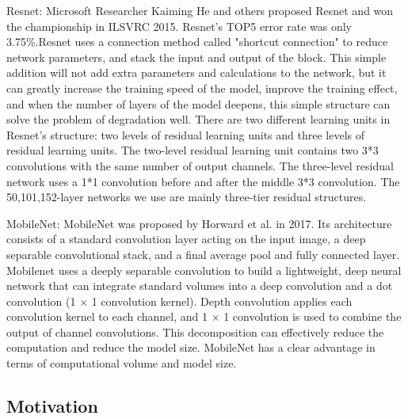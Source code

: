 Resnet: Microsoft Researcher Kaiming He and others proposed Resnet and won the championship in ILSVRC 2015. Resnet's TOP5 error rate was only 3.75\%.Resnet uses a connection method called "shortcut connection" to reduce network parameters, and stack the input and output of the block. This simple addition will not add extra parameters and calculations to the network, but it can greatly increase the training speed of the model, improve the training effect, and when the number of layers of the model deepens, this simple structure can solve the problem of degradation well. There are two different learning units in Resnet's structure: two levels of residual learning units and three levels of residual learning units. The two-level residual learning unit contains two 3*3 convolutions with the same number of output channels. The three-level residual network uses a 1*1 convolution before and after the middle 3*3 convolution. The 50,101,152-layer networks we use are mainly three-tier residual structures.


MobileNet: MobileNet was proposed by Horward et al. in 2017. Its architecture consists of a standard convolution layer acting on the input image, a deep separable convolutional stack, and a final average pool and fully connected layer. Mobilenet uses a deeply separable convolution to build a lightweight, deep neural network that can integrate standard volumes into a deep convolution and a dot convolution (1 × 1 convolution kernel). Depth convolution applies each convolution kernel to each channel, and 1 × 1 convolution is used to combine the output of channel convolutions. This decomposition can effectively reduce the computation and reduce the model size. MobileNet has a clear advantage in terms of computational volume and model size.

\subsection{Motivation}




